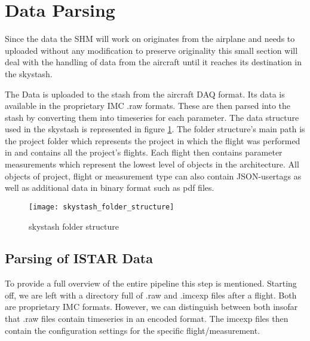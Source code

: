 \section{Data Parsing}

Since the data the SHM will work on originates from the airplane and needs to uploaded without any modification to preserve originality this small section will deal with the handling of data from the aircraft until it reaches its destination in the skystash.

The Data is uploaded to the stash from the aircraft DAQ format. Its data is available in the proprietary IMC .raw formats. These are then parsed into the stash by converting them into timeseries for each parameter. The data structure used in the skystash is represented in figure \ref{fig:skystash_folder_structure}. The folder structure's main path is the project folder which represents the project in which the flight was performed in and contains all the project's flights. Each flight then contains parameter measurements which represent the lowest level of objects in the architecture. All objects of project, flight or measurement type can also contain JSON-usertags as well as additional data in binary format such as pdf files.

\begin{figure}
    \centering
    \texttt{[image: skystash\_folder\_structure]}
    \caption{skystash folder structure}
    \label{fig:skystash_folder_structure}
\end{figure}

\subsection{Parsing of ISTAR Data}


To provide a full overview of the entire pipeline this step is mentioned. Starting off, we are left with a directory full of .raw and .imcexp files after a flight. Both are proprietary IMC formats. However, we can distinguish between both insofar that .raw files contain timeseries in an encoded format. The imcexp files then contain the configuration settings for the specific flight/measurement.

